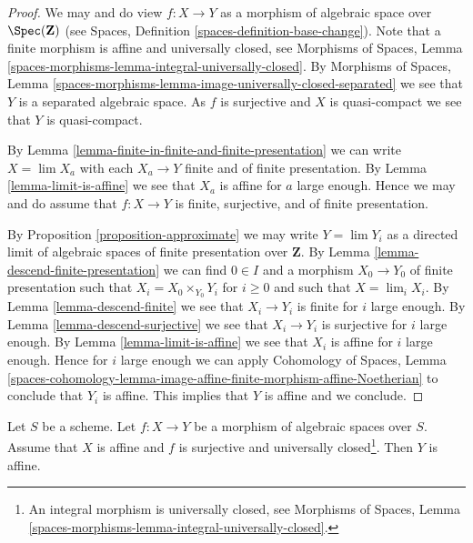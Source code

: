\begin{proof}
We may and do view $f : X \to Y$ as a morphism of algebraic space over
$\Spec(\mathbf{Z})$ (see
Spaces, Definition \ref{spaces-definition-base-change}).
Note that a finite morphism is affine and universally closed, see
Morphisms of Spaces, Lemma
\ref{spaces-morphisms-lemma-integral-universally-closed}.
By Morphisms of Spaces, Lemma
\ref{spaces-morphisms-lemma-image-universally-closed-separated}
we see that $Y$ is a separated algebraic space.
As $f$ is surjective and $X$ is quasi-compact we see that $Y$ is
quasi-compact.

\medskip\noindent
By Lemma \ref{lemma-finite-in-finite-and-finite-presentation}
we can write $X = \lim X_a$ with each $X_a \to Y$ finite and of
finite presentation. By
Lemma \ref{lemma-limit-is-affine}
we see that $X_a$ is affine for $a$ large enough.
Hence we may and do assume that $f : X \to Y$ is finite, surjective, and
of finite presentation.

\medskip\noindent
By Proposition \ref{proposition-approximate} we may write
$Y = \lim Y_i$ as a directed limit of algebraic
spaces of finite presentation over $\mathbf{Z}$.
By Lemma \ref{lemma-descend-finite-presentation} we can
find $0 \in I$ and a morphism $X_0 \to Y_0$ of finite presentation
such that $X_i = X_0 \times_{Y_0} Y_i$ for $i \geq 0$
and such that $X = \lim_i X_i$. By
Lemma \ref{lemma-descend-finite}
we see that $X_i \to Y_i$ is finite for $i$ large enough.
By Lemma \ref{lemma-descend-surjective}
we see that $X_i \to Y_i$ is surjective for $i$ large enough.
By Lemma \ref{lemma-limit-is-affine} we see that $X_i$ is
affine for $i$ large enough. Hence for $i$ large enough we can apply
Cohomology of Spaces, Lemma
\ref{spaces-cohomology-lemma-image-affine-finite-morphism-affine-Noetherian}
to conclude that $Y_i$ is affine. This implies that $Y$ is affine and
we conclude.
\end{proof}

\begin{proposition}
\label{proposition-affine}
Let $S$ be a scheme. Let $f : X \to Y$ be a morphism of algebraic spaces
over $S$. Assume that $X$ is affine and $f$ is surjective and universally
closed\footnote{An integral morphism is universally closed, see
Morphisms of Spaces, Lemma
\ref{spaces-morphisms-lemma-integral-universally-closed}.}. Then $Y$ is affine.
\end{proposition}

